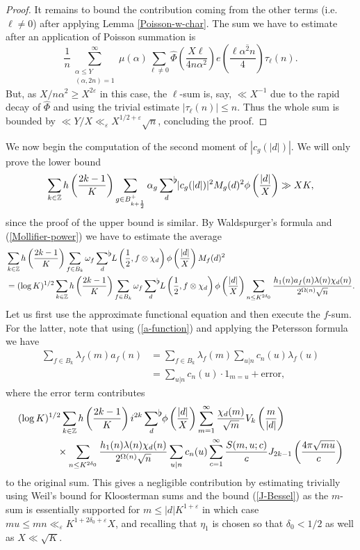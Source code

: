 \documentclass[a4paper,10pt,twoside]{amsart}
\theoremstyle{definition}
\numberwithin{equation}{section}
\newcommand\Z{\mathbb{Z}}
\newcommand\eps{\varepsilon}
\renewcommand\:{\colon}
\newcommand{\sumflat}{\mathop{{\sum}^{\raisebox{-3pt}{\makebox[0pt][l]{$\flat$}}}}}
\begin{document}
\begin{proof}
It remains to bound the contribution coming from the other terms (i.e. $\ell\neq 0$) after applying Lemma \ref{Poisson-w-char}. The sum we have to estimate after an application of Poisson summation is
\[ 
\frac1{n}\sum_{\substack{\alpha\leq Y\\
(\alpha,2n)=1}}^\infty\mu(\alpha)\sum_{\ell\neq 0}\widehat \Phi\left(\frac{X\ell}{4n\alpha^2}\right)e\left(\frac{\ell\overline{\alpha^2n}}{4}\right)\tau_\ell(n).
\] 
But, as $X/n\alpha^2\geq X^{2\eps}$ in this case, the $\ell$-sum is, say, $\ll X^{-1}$ due to the rapid decay of $\widehat \Phi$ and using the trivial estimate $|\tau_\ell(n)|\leq n$. Thus the whole sum is bounded by $\ll Y/X\ll_\eps X^{1/2+\eps}\sqrt{n}$, concluding the proof.
\end{proof}

We now begin the computation of the second moment of $|c_g(|d|)|$. We will only prove the lower bound 
\[
\sum_{k\in\Z}h\left(\frac{2k-1}K\right)\sum_{g\in B^+_{k+\frac12}}\alpha_g\sumflat_d\, |c_g(|d|)|^2 M_g(d)^2\phi\left(\frac{|d|}X\right)\gg XK,
\]
since the proof of the upper bound is similar. By Waldspurger's formula and (\ref{Mollifier-power}) we have to estimate the average 
\begin{align*}
&\sum_{k\in\Z}h\left(\frac{2k-1}K\right)\sum_{f\in B_k}\omega_f\sumflat_d\, L\left(\frac12,f\otimes\chi_d\right)\phi\left(\frac{|d|}X\right)M_f(d)^2 \\
&=(\log K)^{1/2}\sum_{k\in\Z}h\left(\frac{2k-1}K\right)\sum_{f\in B_k}\omega_f\sumflat_d\, L\left(\frac12,f\otimes\chi_d\right)\phi\left(\frac{|d|}X\right) \sum_{n\leq K^{2\delta_0}}\frac{h_1(n)a_f(n)\lambda(n)\chi_d(n)}{2^{\Omega(n)}\sqrt n}.
\end{align*}
Let us first use the approximate functional equation and then execute the $f$-sum. For the latter, note that using (\ref{a-function}) and applying the Petersson formula we have
\begin{align*}
\sum_{f\in B_k}\lambda_f(m)a_f(n)&=\sum_{f\in B_k}\lambda_f(m)\sum_{u|n}c_n(u)\lambda_f(u)\\
&=\sum_{u|n}c_n(u)\cdot 1_{m=u}+\text{error},
\end{align*}
where the error term contributes
\begin{align*}
&(\log K)^{1/2}\sum_{k\in\Z}h\left(\frac{2k-1}K\right)i^{2k}\sumflat_d\,\phi\left(\frac{|d|}X\right)\sum_{m=1}^\infty\frac{\chi_d(m)}{\sqrt m}V_k\left(\frac m{|d|}\right)\\
&\qquad\qquad\times\sum_{n\leq K^{2\delta_0}}\frac{h_1(n)\lambda(n)\chi_d(n)}{2^{\Omega(n)}\sqrt n}\sum_{u|n}c_n(u)\sum_{c=1}^\infty\frac{S(m,u;c)}c J_{2k-1}\left(\frac{4\pi\sqrt{mu}}c\right)
\end{align*}
to the original sum. This gives a negligible contribution by estimating trivially using Weil's bound for Kloosterman sums and the bound (\ref{J-Bessel}) as the $m$-sum is essentially supported for $m\leq |d|K^{1+\eps}$ in which case $mu\leq mn\ll_\eps K^{1+2\delta_0+\eps}X$, and recalling that $\eta_1$ is chosen so that $\delta_0<1/2$ as well as $X\ll\sqrt K$.
\end{document}
